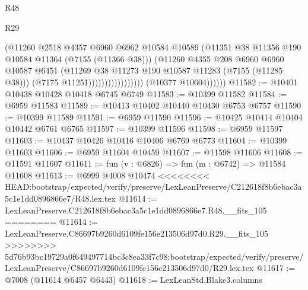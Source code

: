 \begin{lexlean}{R48}
\begin{lexlean}{R29}
\begin{coremodule}
{{{{{{{{{{{{{{{{{{{{{{{{{{{{{{{{{{{{{{{{{{{{{{{{{{{{{{{{{{{{{{{{{{{{{{{{{{{{{{{{{{{{{{{{{{{{{{{{{{{{{{{{{{{{{{{{{{{{{{{{{{{{{{{{{{{{{{{{{{{{{{{{{{{{{{{{{{{{{{{{{{{{{{{{{{{{{{{{{{{{{{{{{{{{{{{{{{{{{{{{{{{{{{{{{{{{{{{{{{                                          (@11260
                                            @2518
                                            @4357
                                            @6960
                                            @6962
                                            @10584
                                            @10589
                                            (@11351
                                              @38
                                              @11356
                                              @190
                                              @10584
                                              @11364
                                              (@7155 (@11366 @38)))
                                            (@11260
                                              @4355
                                              @208
                                              @6960
                                              @6960
                                              @10587
                                              @6451
                                              (@11269
                                                @38
                                                @11273
                                                @190
                                                @10587
                                                @11283
                                                (@7155 (@11285 @38)))
                                              (@7175 @11251)))))))))))))))))
              (@10377 @10604))))))
@11582 := @10401 @10438 @10428 @10418 @6745 @6749
@11583 := @10399 @11582
@11584 := @6959 @11583
@11589 := @10413 @10402 @10440 @10430 @6753 @6757
@11590 := @10399 @11589
@11591 := @6959 @11590
@11596 := @10425 @10414 @10404 @10442 @6761 @6765
@11597 := @10399 @11596
@11598 := @6959 @11597
@11603 := @10437 @10426 @10416 @10406 @6769 @6773
@11604 := @10399 @11603
@11606 := @6959 @11604 @10459
@11607 := @11598 @11606
@11608 := @11591 @11607
@11611 := fun (v : @6826) => fun (m : @6742) => @11584 @11608
@11613 := @6999 @4008 @10474
<<<<<<<< HEAD:bootstrap/expected/verify/preserve/LexLeanPreserve/C212618f8b6ebac3a5c1e1dd0896866e7/R48.lex.tex
@11614 := LexLeanPreserve.C212618f8b6ebac3a5c1e1dd0896866e7.R48.__fits_105
========
@11614 := LexLeanPreserve.C86697b9260d6109fe156e213506d97d0.R29.__fits_105
>>>>>>>> 5d76b93bc19729a0f649497714bc3c8ea33f7c98:bootstrap/expected/verify/preserve/LexLeanPreserve/C86697b9260d6109fe156e213506d97d0/R29.lex.tex
@11617 := @7008 (@11614 @6457 @6443)
@11618 := LexLeanStd.Blake3.columns
}}}}}}}}}}}}}}}}}}}}}}}}}}}}}}}}}}}}}}}}}}}}}}}}}}}}}}}}}}}}}}}}}}}}}}}}}}}}}}}}}}}}}}}}}}}}}}}}}}}}}}}}}}}}}}}}}}}}}}}}}}}}}}}}}}}}}}}}}}}}}}}}}}}}}}}}}}}}}}}}}}}}}}}}}}}}}}}}}}}}}}}}}}}}}}}}}}}}}}}}}}}}}}}}}}}}}}}}}}
\end{coremodule}
\end{lexlean}
\end{lexlean}
